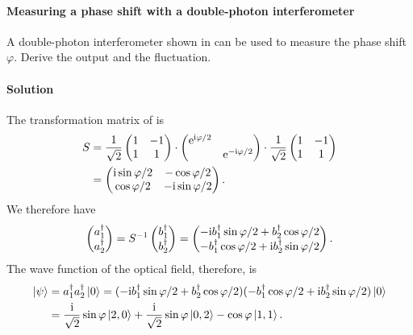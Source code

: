 \documentclass[hyperref, a4paper]{article}
\newcommand*{\ii}{\mathrm{i}}
\newcommand*{\ee}{\mathrm{e}}
\begin{document}
\paragraph{Measuring a phase shift with a double-photon interferometer} A double-photon interferometer shown in  can be used to measure the phase shift $\varphi$.
Derive the output and the fluctuation.

\paragraph{Solution} The transformation matrix of  is 
\begin{equation}
    \begin{aligned}
        S &= \frac{1}{\sqrt{2}} \pmqty{ 1 & -1 \\ 1 & 1 } \cdot \pmqty{\dmat{\ee^{\ii \varphi / 2}, \ee^{- \ii \varphi / 2}}} \cdot \frac{1}{\sqrt{2}} \pmqty{ 1 & -1 \\ 1 & 1 } \\
        &= \pmqty{ \ii \sin \varphi / 2 & - \cos \varphi / 2 \\ \cos \varphi / 2 & - \ii \sin \varphi / 2 }.
    \end{aligned}
\end{equation}
We therefore have 
\begin{equation}
    \pmqty{a_1^\dagger \\ a_2^\dagger} = S^{-1} \pmqty{b_1^\dagger \\ b_2^\dagger} = \pmqty{ - \ii b_1^\dagger \sin \varphi / 2 + b_2^\dagger \cos \varphi / 2 \\ - b_1^\dagger \cos \varphi / 2 + \ii b_2^\dagger \sin \varphi / 2 }.
\end{equation}
The wave function of the optical field, therefore, is 
\begin{equation}
    \begin{aligned}
        \ket{\psi} &= a_1^\dagger a_2^\dagger \ket{0} = (- \ii b_1^\dagger \sin \varphi / 2 + b_2^\dagger \cos \varphi / 2) (- b_1^\dagger \cos \varphi / 2 + \ii b_2^\dagger \sin \varphi / 2) \ket{0} \\
        &= \frac{\ii}{\sqrt{2}} \sin \varphi \ket{2, 0} + \frac{\ii}{\sqrt{2}} \sin \varphi \ket{0, 2} - \cos \varphi \ket{1, 1}.
    \end{aligned}
\end{equation}
\end{document}
